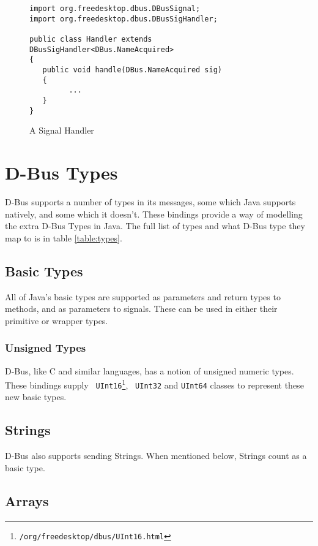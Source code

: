 \documentclass[a4paper,12pt]{article}
\begin{document}
\begin{figure}[htb]
\begin{center}
\begin{verbatim}
import org.freedesktop.dbus.DBusSignal;
import org.freedesktop.dbus.DBusSigHandler;

public class Handler extends DBusSigHandler<DBus.NameAcquired>
{
   public void handle(DBus.NameAcquired sig)
   {
         ...
   }
}
\end{verbatim}
\end{center}
\caption{A Signal Handler}
\label{fig:handler}
\end{figure}


\section{D-Bus Types}

D-Bus supports a number of types in its messages, some which Java
supports natively, and some which it doesn't. These bindings provide
a way of modelling the extra D-Bus Types in Java. The full list of
types and what D-Bus type they map to is in table \ref{table:types}.

\subsection{Basic Types}

All of Java's basic types are supported as parameters and return types to methods, and as parameters to signals. These can be used in either their primitive or wrapper types.

\subsubsection{Unsigned Types}

D-Bus, like C and similar languages, has a notion of unsigned numeric
types. These bindings supply {\tt
UInt16\footnote{\javadocroot/org/freedesktop/dbus/UInt16.html}}, {\tt
UInt32} and {\tt UInt64} classes to represent these new basic types.

\subsection{Strings}

D-Bus also supports sending Strings. When mentioned below, Strings
count as a basic type.

\subsection{Arrays}
\end{document}
